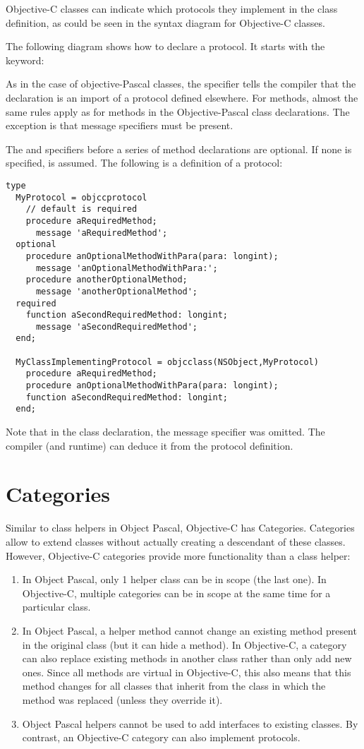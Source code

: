 Objective-C classes can indicate which protocols they implement in the class
definition, as could be seen in the syntax diagram for Objective-C classes.

The following diagram shows how to declare a protocol. It starts with the
 keyword:

As in the case of objective-Pascal classes, the  specifier tells
the compiler that the declaration is an import of a protocol defined
elsewhere. For methods, almost the same rules apply as for methods in 
the Objective-Pascal class declarations. The exception is that message
specifiers must be present.

The  and  specifiers before a series of 
method declarations are optional. If none is specified,  is
assumed. The following is a definition of a protocol: 
\begin{verbatim}
type
  MyProtocol = objccprotocol
    // default is required
    procedure aRequiredMethod; 
      message 'aRequiredMethod';
  optional
    procedure anOptionalMethodWithPara(para: longint); 
      message 'anOptionalMethodWithPara:';
    procedure anotherOptionalMethod; 
      message 'anotherOptionalMethod';
  required
    function aSecondRequiredMethod: longint; 
      message 'aSecondRequiredMethod';
  end;
 
  MyClassImplementingProtocol = objcclass(NSObject,MyProtocol)
    procedure aRequiredMethod;
    procedure anOptionalMethodWithPara(para: longint);
    function aSecondRequiredMethod: longint;
  end;
\end{verbatim}
Note that in the class declaration, the message specifier was omitted.
The compiler (and runtime) can deduce it from the protocol definition.

\section{Categories}
Similar to class helpers in Object Pascal, Objective-C has Categories.
Categories allow to extend classes without actually creating a descendant of
these classes. However, Objective-C categories provide more functionality
than a class helper:
\begin{enumerate}
\item In Object Pascal, only 1 helper class can be in scope (the last one).
In Objective-C, multiple categories can be in scope at the same time for 
a particular class.
\item In Object Pascal, a helper method cannot change an existing method
present in the original class (but it can hide a method). In Objective-C, a category can also
replace existing methods in another class rather than only add new ones.
Since all methods are virtual in Objective-C, this also means that this
method changes for all classes that inherit from the class in which the
method was replaced (unless they override it). 
\item Object Pascal helpers cannot be used to add interfaces to existing
classes. By contrast, an Objective-C category can also implement protocols.
\end{enumerate}


